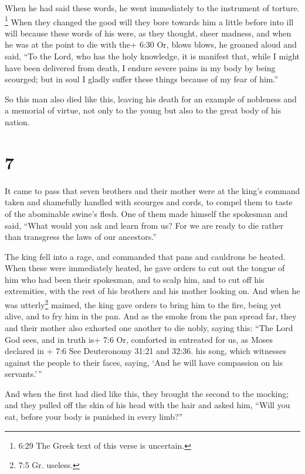 When he had said these words, he went immediately to the instrument of
torture.  \footnote{6:29 The Greek text of this verse is
  uncertain.} When they changed the good will they bore towards him a
little before into ill will because these words of his were, as they
thought, sheer madness,  and when he was at the point to
die with the+ 6:30 Or, blows blows, he groaned aloud and said, ``To the
Lord, who has the holy knowledge, it is manifest that, while I might
have been delivered from death, I endure severe pains in my body by
being scourged; but in soul I gladly suffer these things because of my
fear of him.''

 So this man also died like this, leaving his death for an
example of nobleness and a memorial of virtue, not only to the young but
also to the great body of his nation.

\hypertarget{section-6}{%
\section{7}\label{section-6}}

 It came to pass that seven brothers and their mother were
at the king's command taken and shamefully handled with scourges and
cords, to compel them to taste of the abominable swine's flesh.
 One of them made himself the spokesman and said, ``What
would you ask and learn from us? For we are ready to die rather than
transgress the laws of our ancestors.''

 The king fell into a rage, and commanded that pans and
cauldrons be heated.  When these were immediately heated, he
gave orders to cut out the tongue of him who had been their spokesman,
and to scalp him, and to cut off his extremities, with the rest of his
brothers and his mother looking on.  And when he was
utterly\footnote{7:5 Gr. useless.} maimed, the king gave orders to bring
him to the fire, being yet alive, and to fry him in the pan. And as the
smoke from the pan spread far, they and their mother also exhorted one
another to die nobly, saying this:  ``The Lord God sees, and
in truth is+ 7:6 Or, comforted in entreated for us, as Moses declared in
+ 7:6 See Deuteronomy 31:21 and 32:36. his song, which witnesses against
the people to their faces, saying, `And he will have compassion on his
servants.'\,''

 And when the first had died like this, they brought the
second to the mocking; and they pulled off the skin of his head with the
hair and asked him, ``Will you eat, before your body is punished in
every limb?''

